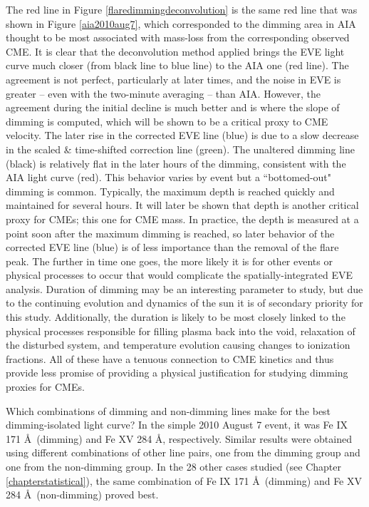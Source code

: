 The red line in Figure \ref{flaredimmingdeconvolution} is the same red line that was shown in Figure \ref{aia2010aug7}, which corresponded to the dimming area in AIA thought to be most associated with mass-loss from the corresponding observed CME. It is clear that the deconvolution method applied brings the EVE light curve much closer (from black line to blue line) to the AIA one (red line). The agreement is not perfect, particularly at later times, and the noise in EVE is greater -- even with the two-minute averaging -- than AIA. However, the agreement during the initial decline is much better and is where the slope of dimming is computed, which will be shown to be a critical proxy to CME velocity. The later rise in the corrected EVE line (blue) is due to a slow decrease in the scaled \& time-shifted correction line (green). The unaltered dimming line (black) is relatively flat in the later hours of the dimming, consistent with the AIA light curve (red). This behavior varies by event but a ``bottomed-out" dimming is common. Typically, the maximum depth is reached quickly and maintained for several hours. It will later be shown that depth is another critical proxy for CMEs; this one for CME mass. In practice, the depth is measured at a point soon after the maximum dimming is reached, so later behavior of the corrected EVE line (blue) is of less importance than the removal of the flare peak. The further in time one goes, the more likely it is for other events or physical processes to occur that would complicate the spatially-integrated EVE analysis. Duration of dimming may be an interesting parameter to study, but due to the continuing evolution and dynamics of the sun it is of secondary priority for this study. Additionally, the duration is likely to be most closely linked to the physical processes responsible for filling plasma back into the void, relaxation of the disturbed system, and temperature evolution causing changes to ionization fractions. All of these have a tenuous connection to CME kinetics and thus provide less promise of providing a physical justification for studying dimming proxies for CMEs. 

Which combinations of dimming and non-dimming lines make for the best dimming-isolated light curve? In the simple 2010 August 7 event, it was Fe IX 171 \AA\ (dimming) and Fe XV 284 \AA, respectively. Similar results were obtained using different combinations of other line pairs, one from the dimming group and one from the non-dimming group. In the 28 other cases studied (see Chapter \ref{chapterstatistical}), the same combination of Fe IX 171 \AA\ (dimming) and Fe XV 284 \AA\ (non-dimming) proved best. 

